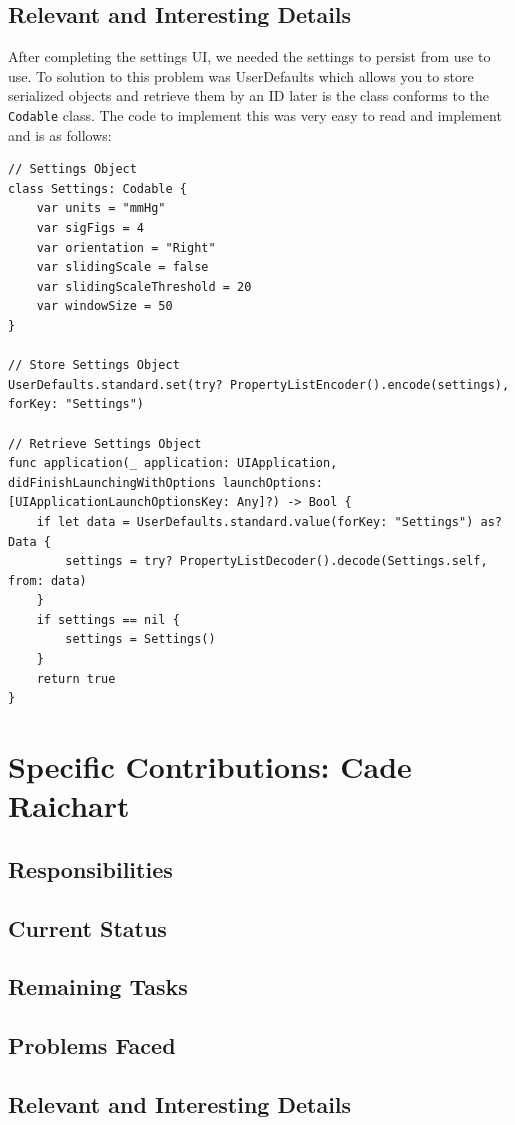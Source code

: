 \documentclass[onecolumn, draftclsnofoot,10pt, compsoc]{IEEEtran}
\begin{document}
    \subsection{Relevant and Interesting Details}
        After completing the settings UI, we needed the settings to persist from use to use.
        To solution to this problem was UserDefaults which allows you to store serialized objects and retrieve them by an ID later is the class conforms to the \texttt{Codable} class.
        The code to implement this was very easy to read and implement and is as follows:

\begin{lstlisting}
// Settings Object
class Settings: Codable {
    var units = "mmHg"
    var sigFigs = 4
    var orientation = "Right"
    var slidingScale = false
    var slidingScaleThreshold = 20
    var windowSize = 50
}

// Store Settings Object
UserDefaults.standard.set(try? PropertyListEncoder().encode(settings), forKey: "Settings")

// Retrieve Settings Object
func application(_ application: UIApplication, didFinishLaunchingWithOptions launchOptions: [UIApplicationLaunchOptionsKey: Any]?) -> Bool {
    if let data = UserDefaults.standard.value(forKey: "Settings") as? Data {
        settings = try? PropertyListDecoder().decode(Settings.self, from: data)
    }
    if settings == nil {
        settings = Settings()
    }
    return true
}

\end{lstlisting}


\section{Specific Contributions: Cade Raichart}
\subsection{Responsibilities}
\subsection{Current Status}
\subsection{Remaining Tasks}
\subsection{Problems Faced}
\subsection{Relevant and Interesting Details}
\end{document}

